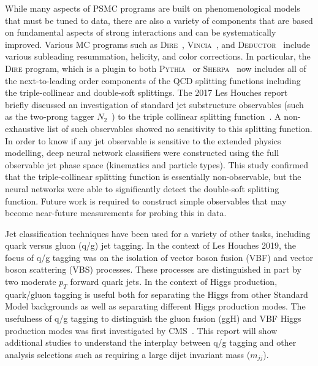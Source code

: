 \documentclass[11pt]{cernrep}
\begin{document}
While many aspects of PSMC programs are built on phenomenological models that must be tuned to data, there are also a variety of components that are based on fundamental aspects of strong interactions and can be systematically improved.  Various MC programs such as \textsc{Dire}~\cite{Hoche:2015sya}, \textsc{Vincia}~\cite{Giele:2007di}, and \textsc{Deductor}~\cite{Nagy:2014mqa} include various subleading resummation, helicity, and color corrections.  In particular, the \textsc{Dire} program, which is a plugin to both \textsc{Pythia}~\cite{Sjostrand:2014zea,Sjostrand:2007gs} or \textsc{Sherpa}~\cite{Gleisberg:2008ta,Bothmann:2019yzt} now includes all of the next-to-leading order components of the QCD splitting functions including the triple-collinear and double-soft splittings.   The 2017 Les Houches report briefly discussed an investigation of standard jet substructure observables (such as the two-prong tagger $N_2$~\cite{Moult:2016cvt}) to the triple collinear splitting function~\cite{Bendavid:2018nar}.  A non-exhaustive list of such observables showed no sensitivity to this splitting function.  In order to know if any jet observable is sensitive to the extended physics modelling, deep neural network classifiers were constructed using the full observable jet phase space (kinematics and particle types).   This study confirmed that the triple-collinear splitting function is essentially non-observable, but the neural networks were able to significantly detect the double-soft splitting function.  Future work is required to construct simple observables that may become near-future measurements for probing this in data.

Jet classification techniques have been used for a variety of other tasks, including quark versus gluon (q/g) jet tagging.  In the context of Les Houches 2019, the focus of q/g tagging was on the isolation of vector boson fusion (VBF) and vector boson scattering (VBS) processes.  These processes are distinguished in part by two moderate $p_T$ forward quark jets.  In the context of Higgs production, quark/gluon tagging is useful both for separating the Higgs from other Standard Model backgrounds as well as separating different Higgs production modes.   The usefulness of q/g tagging to distinguish the gluon fusion (ggH) and VBF Higgs production modes was first investigated by CMS~\cite{Khachatryan:2015bnx}.  This report will show additional studies to understand the interplay between q/g tagging and other analysis selections such as requiring a large dijet invariant mass ($m_{jj}$).
\end{document}
